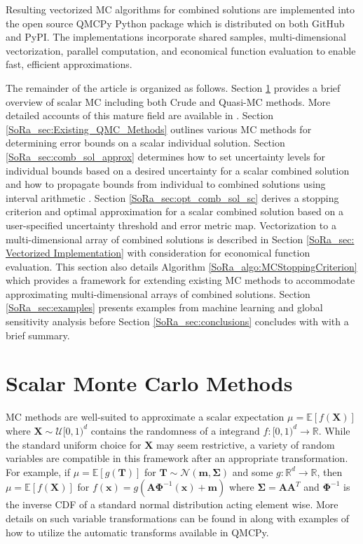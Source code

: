 \documentclass[graybox]{svmult}
\begin{document}
Resulting vectorized MC algorithms for combined solutions are implemented into the open source QMCPy Python package \cite{QMCPy} which is distributed on both GitHub and PyPI. The implementations incorporate shared samples, multi-dimensional vectorization, parallel computation, and economical function evaluation to enable fast, efficient approximations.

The remainder of the article is organized as follows. Section \ref{SoRa_sec:MCM} provides a brief overview of scalar MC including both Crude and Quasi-MC methods. More detailed accounts of this mature field are available in \cite{niederreiter1992random}. Section \ref{SoRa_sec:Existing_QMC_Methods} outlines various MC methods for determining error bounds on a scalar individual solution. Section \ref{SoRa_sec:comb_sol_approx} determines how to set uncertainty levels for individual bounds based on a desired uncertainty for a scalar combined solution and how to propagate bounds from individual to combined solutions using interval arithmetic \cite{interval_analysis}. Section \ref{SoRa_sec:opt_comb_sol_sc} derives a stopping criterion and optimal approximation for a scalar combined solution based on a user-specified uncertainty threshold and error metric map. Vectorization to a multi-dimensional array of combined solutions is described in Section \ref{SoRa_sec: Vectorized Implementation} with consideration for economical function evaluation. This section also details Algorithm \ref{SoRa_algo:MCStoppingCriterion} which provides a framework for extending existing MC methods to accommodate approximating multi-dimensional arrays of combined solutions. Section \ref{SoRa_sec:examples} presents examples from machine learning and global sensitivity analysis before Section \ref{SoRa_sec:conclusions} concludes with with a brief summary.   

\section{Scalar Monte Carlo Methods} \label{SoRa_sec:MCM}

MC methods are well-suited to approximate a scalar expectation $\mu = \mathbb{E}[f(\boldsymbol{X})]$ where $\boldsymbol{X} \sim \mathcal{U}[0,1)^d$ contains the randomness of a integrand $f: [0,1)^{d} \to \mathbb{R}$. While the standard uniform choice for $\boldsymbol{X}$ may seem restrictive, a variety of random variables are compatible in this framework after an appropriate transformation. For example, if $\mu = \mathbb{E}[g(\boldsymbol{T})]$ for $\boldsymbol{T} \sim \mathcal{N}(\boldsymbol{m},\boldsymbol{\Sigma})$ and some $g: \mathbb{R}^{d} \to \mathbb{R}$, then $\mu = \mathbb{E}[f(\boldsymbol{X})]$ for  $f(\boldsymbol{x})=g(\boldsymbol{A}\boldsymbol{\Phi}^{-1}(\boldsymbol{x})+\boldsymbol{m})$ where $\boldsymbol{\Sigma}=\boldsymbol{A}\boldsymbol{A}^T$ and $\boldsymbol{\Phi}^{-1}$ is the inverse CDF of a standard normal distribution acting element wise. More details on such variable transformations can be found in \cite{QMCSoftware} along with examples of how to utilize the automatic transforms available in QMCPy.
\end{document}
